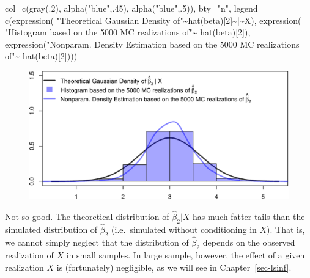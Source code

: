 \documentclass[
  letterpaper,
  DIV=11,
  numbers=noendperiod]{scrreprt}
\newenvironment{Shaded}{\begin{snugshade}}{\end{snugshade}}
\newcommand{\AttributeTok}[1]{\textcolor[rgb]{0.40,0.45,0.13}{#1}}
\newcommand{\DecValTok}[1]{\textcolor[rgb]{0.68,0.00,0.00}{#1}}
\newcommand{\FunctionTok}[1]{\textcolor[rgb]{0.28,0.35,0.67}{#1}}
\newcommand{\NormalTok}[1]{\textcolor[rgb]{0.00,0.23,0.31}{#1}}
\newcommand{\SpecialCharTok}[1]{\textcolor[rgb]{0.37,0.37,0.37}{#1}}
\newcommand{\StringTok}[1]{\textcolor[rgb]{0.13,0.47,0.30}{#1}}
\theoremstyle{definition}
\theoremstyle{plain}
\theoremstyle{plain}
\theoremstyle{remark}
\begin{document}
\begin{Shaded}
\begin{Highlighting}[]
     \AttributeTok{col=}\FunctionTok{c}\NormalTok{(}\FunctionTok{gray}\NormalTok{(.}\DecValTok{2}\NormalTok{), }\FunctionTok{alpha}\NormalTok{(}\StringTok{"blue"}\NormalTok{,.}\DecValTok{45}\NormalTok{), }\FunctionTok{alpha}\NormalTok{(}\StringTok{"blue"}\NormalTok{,.}\DecValTok{5}\NormalTok{)), }\AttributeTok{bty=}\StringTok{"n"}\NormalTok{, }\AttributeTok{legend=} 
\FunctionTok{c}\NormalTok{(}\FunctionTok{expression}\NormalTok{(}
  \StringTok{"Theoretical Gaussian Density of"}\SpecialCharTok{\textasciitilde{}}\FunctionTok{hat}\NormalTok{(beta)[}\DecValTok{2}\NormalTok{]}\SpecialCharTok{\textasciitilde{}}\StringTok{\textquotesingle{}|\textquotesingle{}}\SpecialCharTok{\textasciitilde{}}\NormalTok{X), }
\FunctionTok{expression}\NormalTok{(}
  \StringTok{"Histogram based on the 5000 MC realizations of"}\SpecialCharTok{\textasciitilde{}}
  \FunctionTok{hat}\NormalTok{(beta)[}\DecValTok{2}\NormalTok{]), }
\FunctionTok{expression}\NormalTok{(}\StringTok{"Nonparam. Density Estimation based on the 5000 MC realizations of"}\SpecialCharTok{\textasciitilde{}}
  \FunctionTok{hat}\NormalTok{(beta)[}\DecValTok{2}\NormalTok{])))}
\end{Highlighting}
\end{Shaded}

\begin{figure}[H]

{\centering \includegraphics{./05-Small-Sample-Inference_files/figure-pdf/unnamed-chunk-16-1.pdf}

}

\end{figure}

Not so good. The theoretical distribution of \(\hat\beta_2|X\) has much
fatter tails than the simulated distribution of \(\hat\beta_2\)
(i.e.~simulated without conditioning in \(X\)). That is, we cannot
simply neglect that the distribution of \(\hat\beta_2\) depends on the
observed realization of \(X\) in small samples. In large sample,
however, the effect of a given realization \(X\) is (fortunately)
negligible, as we will see in Chapter~\ref{sec-lsinf}.
\end{document}
